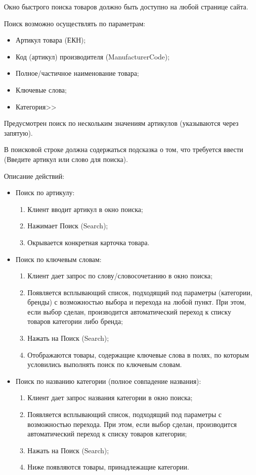 {

\begin{itogolong}
Окно быстрого поиска товаров должно быть доступно на любой странице сайта.

Поиск возможно осуществлять по параметрам:
\begin{itemize}
	\item Артикул товара (ЕКН);
    \item Код (артикул) производителя (ManufacturerCode);		
	\item Полное/частичное наименование товара;
	\item Ключевые слова;
	\item Категория>>
\end{itemize}

Предусмотрен поиск по нескольким значениям артикулов (указываются через запятую).

В поисковой строке должна содержаться подсказка о том, что требуется ввести (Введите артикул или слово для поиска).

Описание действий:
\begin{itemize}

\item Поиск по артикулу:
	\begin{enumerate} 
		\item Клиент вводит артикул в окно поиска;
		\item Нажимает Поиск (Search);
		\item Окрывается конкретная карточка товара.
	\end{enumerate}	
	
\item Поиск по ключевым словам:
 	\begin{enumerate} 
	 	\item Клиент дает запрос по слову/словосочетанию в окно поиска;
		\item Появляется всплывающий список, подходящий под параметры (категории, бренды) с возможностью выбора и перехода на любой пункт. При этом, если выбор сделан, производится автоматический переход к списку товаров категории либо бренда;
		\item Нажать на Поиск (Search);
		\item Отображаются товары, содержащие ключевые слова в полях, по которым условились выполнять поиск по ключевым словам.
	\end{enumerate}
	
\item Поиск по названию категории (полное совпадение названия):
 	\begin{enumerate} 
 		\item Клиент дает запрос названия категории в окно поиска;
		\item	Появляется всплывающий список, подходящий под параметры с возможностью перехода. При этом, если выбор сделан, производится автоматический переход к списку товаров категории;
		\item	Нажать на Поиск (Search);
		\item	Ниже появляются товары, принадлежащие категории.
	\end{enumerate}	
		

\end{itemize}
\end{itogolong}}
